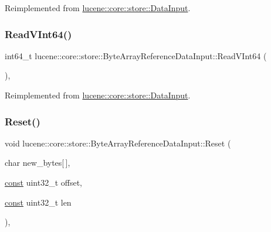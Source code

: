 Reimplemented from \mbox{\hyperlink{classlucene_1_1core_1_1store_1_1DataInput_aa4539e00fc3d2735814a6656455ac74b}{lucene\+::core\+::store\+::\+Data\+Input}}.

\mbox{\label{classlucene_1_1core_1_1store_1_1ByteArrayReferenceDataInput_a607628859721dc59ff3d92bcf740dbf1}} 
\subsubsection{\texorpdfstring{Read\+V\+Int64()}{ReadVInt64()}}
{\footnotesize\ttfamily int64\+\_\+t lucene\+::core\+::store\+::\+Byte\+Array\+Reference\+Data\+Input\+::\+Read\+V\+Int64 (\begin{DoxyParamCaption}{ }\end{DoxyParamCaption})\hspace{0.3cm}{\ttfamily [inline]}, {\ttfamily [virtual]}}



Reimplemented from \mbox{\hyperlink{classlucene_1_1core_1_1store_1_1DataInput_a71781c16e8c3ebf21dcafb37cee5bcc6}{lucene\+::core\+::store\+::\+Data\+Input}}.

\mbox{\label{classlucene_1_1core_1_1store_1_1ByteArrayReferenceDataInput_a287e2f7dbaa01e82bc6ad0eb787c263c}} 
\subsubsection{\texorpdfstring{Reset()}{Reset()}}
{\footnotesize\ttfamily void lucene\+::core\+::store\+::\+Byte\+Array\+Reference\+Data\+Input\+::\+Reset (\begin{DoxyParamCaption}\item[{char}]{new\+\_\+bytes\mbox{[}$\,$\mbox{]},  }\item[{\mbox{\hyperlink{ZlibCrc32_8h_a2c212835823e3c54a8ab6d95c652660e}{const}} uint32\+\_\+t}]{offset,  }\item[{\mbox{\hyperlink{ZlibCrc32_8h_a2c212835823e3c54a8ab6d95c652660e}{const}} uint32\+\_\+t}]{len }\end{DoxyParamCaption})\hspace{0.3cm}{\ttfamily [inline]}, {\ttfamily [noexcept]}}

